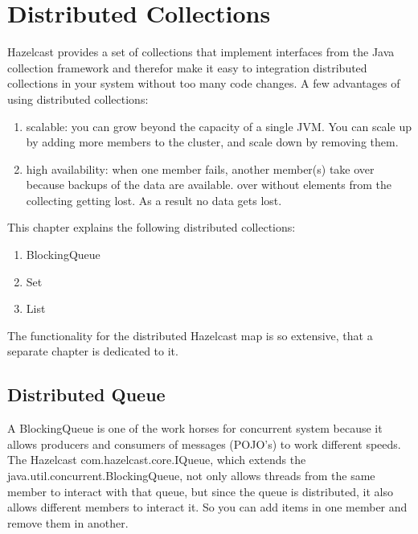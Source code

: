 \chapter{Distributed Collections}
Hazelcast provides a set of collections that implement interfaces from the Java collection framework and therefor make it easy to integration distributed collections in your system without too many code changes. A few advantages of using distributed collections:
\begin{enumerate}
\item scalable: you can grow beyond the capacity of a single JVM. You can scale up by adding more members to the cluster, and scale down by removing them.
\item high availability: when one member fails, another member(s) take over because backups of the data are available. over without elements from the collecting getting lost. As a result no data gets lost.
\end{enumerate}

This chapter explains the following distributed collections:
\begin{enumerate}
\item BlockingQueue
\item Set
\item List
\end{enumerate}
The functionality for the distributed Hazelcast map is so extensive, that a separate chapter is dedicated to it. 

\section{Distributed Queue}
A BlockingQueue is one of the work horses for concurrent system because it allows producers and consumers of messages (POJO's) to work different speeds. The Hazelcast com.hazelcast.core.IQueue, which extends the java.util.concurrent.BlockingQueue, not only allows threads from the same member to interact with that queue, but since the queue is distributed, it also allows different members to interact it. So you can add items in one member and remove them in another.

